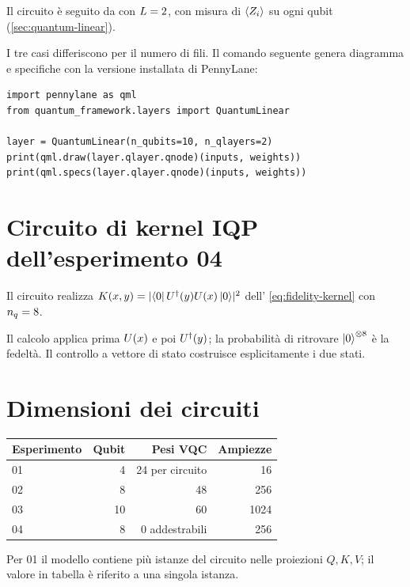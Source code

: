 Il circuito è  seguito da 
con $L = 2$, con misura di $\langle Z_i \rangle$ su ogni qubit
(\cref{sec:quantum-linear}).

I tre casi differiscono per il numero di fili. Il comando seguente genera
diagramma e specifiche con la versione installata di PennyLane:

\begin{lstlisting}[style=python, numbers=none]
import pennylane as qml
from quantum_framework.layers import QuantumLinear

layer = QuantumLinear(n_qubits=10, n_qlayers=2)
print(qml.draw(layer.qlayer.qnode)(inputs, weights))
print(qml.specs(layer.qlayer.qnode)(inputs, weights))
\end{lstlisting}

\section{Circuito di kernel IQP dell'esperimento 04}

Il circuito  realizza
$K(x,y) = \lvert \bra{0}U^{\dagger}(y)U(x)\ket{0} \rvert^2$ dell'
\cref{eq:fidelity-kernel} con $n_q = 8$.

Il calcolo applica prima $U(x)$ e poi $U^{\dagger}(y)$; la probabilità
di ritrovare $\ket{0}^{\otimes8}$ è la fedeltà. Il controllo a vettore di stato
costruisce esplicitamente i due stati.

\section{Dimensioni dei circuiti}

\begin{center}
\begin{tabular}{@{}l r r r@{}}\toprule
\textbf{Esperimento}&\textbf{Qubit}&\textbf{Pesi VQC}&\textbf{Ampiezze}\\\midrule
01&4&24 per circuito&16\\
02&8&48&256\\
03&10&60&1024\\
04&8&0 addestrabili&256\\\bottomrule
\end{tabular}
\end{center}
Per 01 il modello contiene più istanze del circuito nelle proiezioni $Q,K,V$;
il valore in tabella è riferito a una singola istanza.
